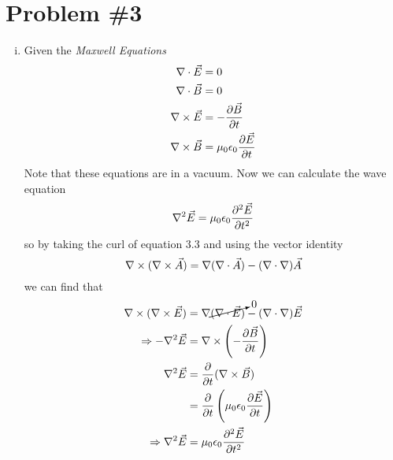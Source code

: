 \documentclass[11pt]{article}
\numberwithin{equation}{section}
\begin{document}
\section{Problem \#3}
\begin{enumerate}[(i)]
\item
Given the \emph{Maxwell Equations}
\begin{align}
\bold\nabla\cdot\vec{E} &= 0 \\
\bold\nabla\cdot\vec{B} &= 0 \\
\bold\nabla\times\vec{E} &= -\frac{\partial\vec{B}}{\partial t} \\   
\bold\nabla\times\vec{B} &= \mu_0\epsilon_0\frac{\partial\vec{E}}{\partial t}
\end{align}
Note that these equations are in a vacuum. Now we can calculate the wave equation 
$$\bold\nabla^2\vec{E} = \mu_0\epsilon_0\frac{\partial^2\vec{E}}{\partial t^2}$$
so by taking the curl of equation 3.3 and using the vector identity 
\begin{equation}
\bold\nabla\times(\bold\nabla\times\vec{A}) = \bold\nabla(\bold\nabla\cdot\vec{A}) - (\bold\nabla\cdot\bold\nabla)\vec{A}
\label{ident}
\end{equation}
we can find that
\begin{align*}
\bold\nabla\times(\bold\nabla\times\vec{E}) &= \bold\nabla\cancelto{0}{(\bold\nabla\cdot\vec{E})} - (\bold\nabla\cdot\bold\nabla)\vec{E}\\
\Rightarrow -\bold\nabla^2\vec{E} &= \bold\nabla\times\left(-\frac{\partial\vec{B}}{\partial t}\right)\\
\bold\nabla^2\vec{E} &= \frac{\partial}{\partial t}(\bold\nabla\times\vec{B})\\
&= \frac{\partial}{\partial t}\left(\mu_0\epsilon_0\frac{\partial\vec{E}}{\partial t}\right)\\
\Rightarrow \bold\nabla^2\vec{E} &= \mu_0\epsilon_0\frac{\partial^2\vec{E}}{\partial t^2}
\end{align*}


\end{enumerate}
\end{document}
